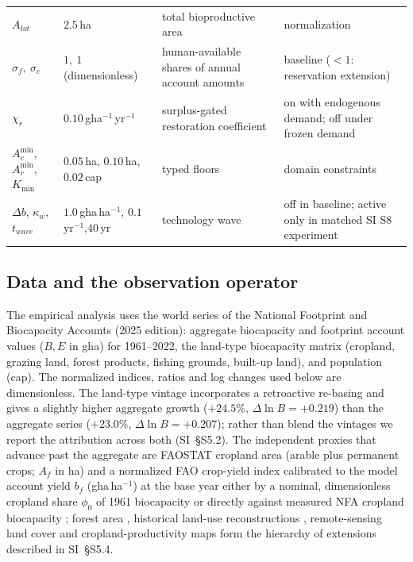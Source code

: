 \documentclass[preprint,12pt,authoryear]{elsarticle}
\newcommand{\Acmin}{A_c^{\min}}
\begin{document}
\begin{table}[!htbp]
\begin{tabularx}{\textwidth}{@{}>{\raggedright\arraybackslash}p{} >{\raggedright\arraybackslash}p{} >{\raggedright\arraybackslash}X >{\raggedright\arraybackslash}p{}@{}}
$A_{tot}$ & $2.5$\,ha & total bioproductive area & normalization \\
$\sigma_f,\ \sigma_c$ & $1,\ 1$ (dimensionless) & human-available shares of annual account amounts & baseline ($<1$: reservation extension) \\
$\chi_r$ & $0.10$\,gha$^{-1}$\,yr$^{-1}$ & surplus-gated restoration coefficient & on with endogenous demand; off under frozen demand \\
$\Acmin$, $A_r^{\min}$,\newline $K_{\min}$ & $0.05$\,ha, $0.10$\,ha,\newline $0.02$\,cap & typed floors & domain constraints \\
$\Delta b$, $\kappa_w$,\newline $t_{wave}$ & $1.0$\,gha\,ha$^{-1}$, $0.1$\,yr$^{-1}$,\newline $40$\,yr & technology wave & off in baseline; active only in matched SI S8 experiment \\
\bottomrule
\end{tabularx}
\end{table}

\subsection{Data and the observation operator}\label{sec:data}

The empirical analysis uses the world series of the National Footprint and Biocapacity Accounts (2025 edition): aggregate biocapacity and footprint account values ($B,E$ in gha) for 1961--2022, the land-type biocapacity matrix (cropland, grazing land, forest products, fishing grounds, built-up land), and population (cap). The normalized indices, ratios and log changes used below are dimensionless. The land-type vintage incorporates a retroactive re-basing and gives a slightly higher aggregate growth ($+24.5\%$, $\Delta\ln B=+0.219$) than the aggregate series ($+23.0\%$, $\Delta\ln B=+0.207$); rather than blend the vintages we report the attribution across both (SI~\S S5.2). The independent proxies that advance past the aggregate are FAOSTAT cropland area (arable plus permanent crops; $A_f$ in ha) and a normalized FAO crop-yield index calibrated to the model account yield $b_f$ (gha\,ha$^{-1}$) at the base year either by a nominal, dimensionless cropland share $\phi_0$ of 1961 biocapacity or directly against measured NFA cropland biocapacity \citep{FAO2023}; forest area \citep{FAO2020}, historical land-use reconstructions \citep{Hurtt2011,KleinGoldewijk2017}, remote-sensing land cover \citep{ESA2017,Copernicus2019} and cropland-productivity maps \citep{Monfreda2008} form the hierarchy of extensions described in SI~\S S5.4.
\end{document}
